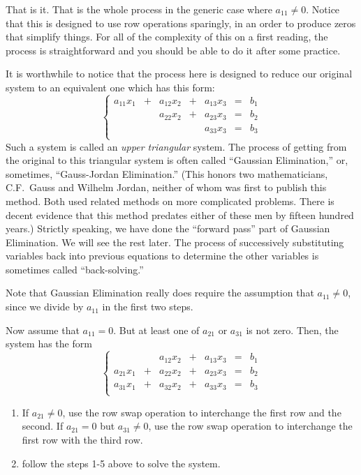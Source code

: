 \documentclass[00-livre-main.tex]{subfiles}
\begin{document}
That is it. That is the whole process in the generic case where $a_{11}\neq 0$. Notice that this is designed to use row operations sparingly, in an order to produce zeros that simplify things. For all of the complexity of this on a first reading, the process is straightforward and you should be able to do it after some practice.

It is worthwhile to notice that the process here is designed to reduce our original system to an equivalent one which has this form:
\[
\left\{\begin{array}{rrrrrrr}
a_{11}x_1 & + & a_{12} x_2 & + & a_{13}x_3 & = & b_1 \\
& & a_{22} x_2 & + & a_{23}x_3 & = & b_2 \\
&&& & a_{33}x_3 & = & b_3 \\
\end{array}\right.
\]
Such a system is called an \emph{upper triangular} system. The process of getting from the original to this triangular system is often called ``Gaussian Elimination,'' or, sometimes, ``Gauss-Jordan Elimination.'' (This honors two mathematicians, C.F.~Gauss and Wilhelm Jordan, neither of whom was first to publish this method. Both used related methods on more complicated problems. There is decent evidence that this method predates either of these men by fifteen hundred years.) Strictly speaking, we have done the ``forward pass'' part of Gaussian Elimination. We will see the rest later. The process of successively substituting variables back into previous equations to determine the other variables is sometimes called ``back-solving.''

Note that Gaussian Elimination really does require the assumption that $a_{11} \neq 0$, since we divide by $a_{11}$ in the first two steps. 

Now assume that $a_{11} = 0$. But at least one of $a_{21}$ or $a_{31}$ is not zero. Then, the system has the form 
\[
\left\{\begin{array}{rrrrrrr}
 &  & a_{12} x_2 & + & a_{13}x_3 & = & b_1 \\
a_{21}x_1 & + & a_{22} x_2 & + & a_{23}x_3 & = & b_2 \\
a_{31}x_1 & + & a_{32} x_2 & + & a_{33}x_3 & = & b_3 \\
\end{array}\right.
\]

\begin{enumerate}
\item If $a_{21} \neq 0$, use the row swap operation to interchange the first row and the second. If $a_{21}=0$ but $a_{31}\neq 0$, use the row swap operation to interchange the first row with the third row.

\item follow the steps 1-5 above to solve the system.
\end{enumerate}
\end{document}
